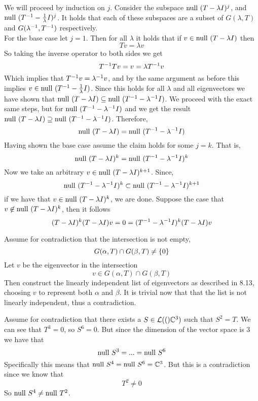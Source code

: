 \documentclass[10pt, twocolumn]{article}
\begin{document}
\begin{q}[3]
    We will proceed by induction on $ j $. 
    Consider the subspace $ \text{null } (T - \lambda I)^j $, 
    and $ \text{null } (T^{-1} - \frac{1}{\lambda} I)^j $. 
    It holds that each of these subspaces are a subset of 
    $ G(\lambda, T) $ and $ G(\lambda^{-1}, T^{-1}) $ respectively. \\
    For the base case let $ j = 1 $.
    Then for all $ \lambda $ it holds that if 
    $ v \in \text{null } (T - \lambda I) $ then 
    $$ Tv = \lambda v $$
    So taking the inverse operator to both sides we get
    $$ T^{-1}Tv = v = \lambda T^{-1} v $$
    Which implies that 
    $ T^{-1}v = \lambda^{-1} v $, 
    and by the same argument as before this implies $ v \in \text{null } (T^{-1} - \frac{1}{\lambda} I) $. 
    Since this holds for all $ \lambda $ 
    and all eigenvectors we have shown that 
    $ \text{null } (T - \lambda I) \subseteq \text{null } (T^{-1} - \lambda^{-1} I) $. 
    We proceed with the exact same steps, but for $\text{null } (T^{-1} - \lambda^{-1} I) $ and we get the result
    $ \text{null } (T - \lambda I) \supseteq \text{null } (T^{-1} - \lambda^{-1} I) $. 
    Therefore, 
    $$ \text{null } (T - \lambda I) = \text{null } (T^{-1} - \lambda^{-1} I) $$
    Having shown the base case assume the claim holds for some $ j = k $.
    That is, 
    $$ \text{null } (T - \lambda I)^k = \text{null } (T^{-1} - \lambda^{-1} I)^k $$
    Now we take an arbitrary $ v \in \text{null } (T - \lambda I)^{k+1} $. 
    Since, 
    $$ \text{null } (T^{-1} - \lambda^{-1} I)^k \subset \text{null } (T^{-1} - \lambda^{-1} I)^{k + 1} $$
    if we have that $ v \in \text{null } (T - \lambda I)^{k} $, we are done. 
    Suppose the case that $ v \not\in \text{null } (T - \lambda I)^{k} $, 
    then it follows 
    $$ (T - \lambda I)^k (T - \lambda I) v = 0 = (T^{-1} - \lambda^{-1} I)^k (T - \lambda I)v $$

\end{q}

\begin{q}[4]
    Assume for contradiction that the intersection is not empty, 
    $$ G(\alpha, T) \cap G(\beta, T) \neq \{0\} $$
    Let $ v $ be the eigenvector in the intersection
    $$ v \in G(\alpha, T) \cap G(\beta, T) $$
    Then construct the linearly independent list of eigenvectors as described in 8.13, choosing $ v $ to represent both $ \alpha $ and $ \beta $. 
    It is trivial now that that the list is not linearly independent, thus a contradiction.
\end{q}

\begin{q}[6]
    Assume for contradiction that there exists a $ S \in \mathcal{L}(()\mathbb{C}^3) $
    such that $ S^2 = T $. 
    We can see that $ T^3 = 0 $, so $ S^6 = 0 $. 
    But since the dimension of the vector space is 3 we have that
    $$ \text{null } S^3 = ... = \text{null } S^6 $$
    Specifically this means that $ \text{null } S^4 = \text{null } S^6 = \mathbb{C}^3 $. 
    But this is a contradiction since we know that 
    $$ T^2 \neq 0 $$
    So $ \text{null } S^4 \neq \text{null } T^2 $. 
\end{q}
\end{document}
